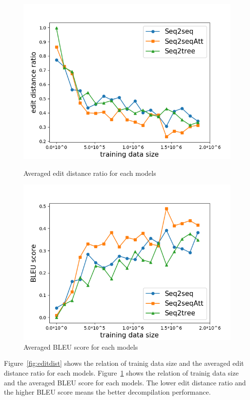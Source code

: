 \documentclass[senior,final,11pt]{iscs-thesis}
\begin{document}
\begin{figure}[]
	\includegraphics[width=12cm]{edit_dist.png}
	\caption{Averaged edit distance ratio for each models}
	\label{fig:editdist}
	\includegraphics[width=12cm]{bleu.png}
	\caption{Averaged BLEU score for each models}
	\label{fig:bleu}
\end{figure}

Figure~\ref{fig:editdist} shows the relation of trainig data size and the averaged edit distance ratio for each models.
Figure~\ref{fig:bleu} shows the relation of trainig data size and the averaged BLEU score for each models.
The lower edit distance ratio and the higher BLEU score means the better decompilation performance.
\end{document}
